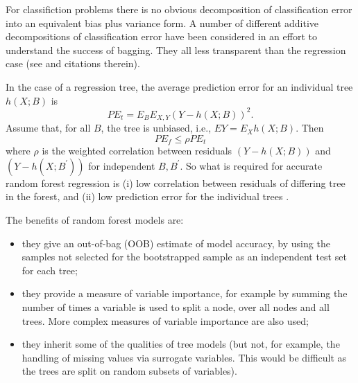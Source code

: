 \documentclass[10pt,letterpaper]{article}
\let\oldmarginpar\marginpar
\renewcommand\marginpar[1]{\-\oldmarginpar[\raggedleft\footnotesize #1]%
{\raggedright\footnotesize #1}}
\begin{document}
For classifiction problems there is no obvious decomposition of classification error into an equivalent bias plus
variance form. A number of different additive decompositions of classification error have been considered in an effort
to understand the success of bagging. They all less transparent than the regression case (see \cite{Friedman.1997} and
citations therein).

In the case of a regression tree, the average prediction error for an individual tree $h(X; B)$ is
\begin{equation}
PE_t = E_B E_{X,Y} (Y-h(X; B))^2.
\end{equation}
Assume that, for all $B$, the tree is unbiased, i.e., $EY= E_X h(X; B)$. Then
\begin{equation}
PE_f \leq \rho PE_t
\end{equation}
where $\rho$ is the weighted correlation between residuals $(Y-h(X;B))$ and $(Y-h(X;B^\prime))$ for independent
$B,B^\prime$.
\marginpar{why is this true}  
So what is required for accurate random forest regression is (i) low correlation between residuals of differing tree in
the forest, and (ii) low prediction error for the individual trees \cite{Segal.2004}. 

The benefits of random forest models are:
\begin{itemize}
\item they give an out-of-bag (OOB) estimate of model accuracy, by using the samples not selected for the bootstrapped sample
  as an independent test set for each tree;
\item they provide a measure of variable importance, for example by summing the number of times a variable is used to
  split a node, over all nodes and all trees. More complex measures of variable importance are also used;
\item they inherit some of the qualities of tree models (but not, for example, the handling of missing values via surrogate
  variables. This would be difficult as the trees are split on random subsets of variables).
\end{itemize}
\end{document}
